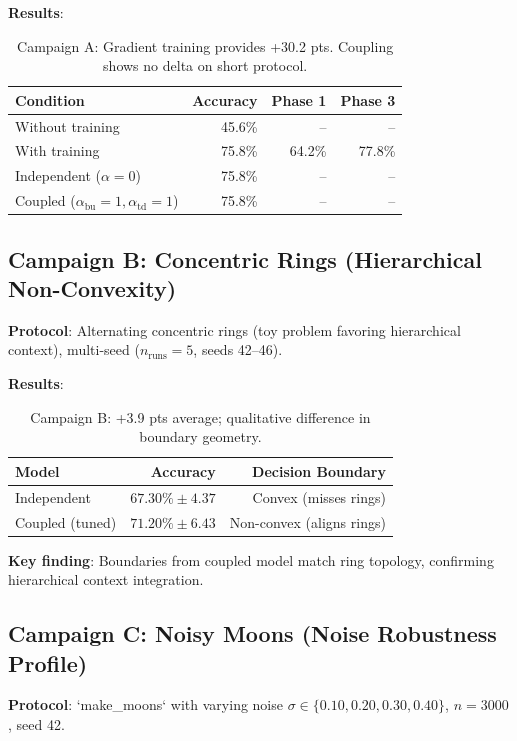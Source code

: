 \documentclass[11pt,a4paper]{article}
\begin{document}
\textbf{Results}:
\begin{table}[h]
\centering
\begin{tabular}{lrrr}
\toprule
\textbf{Condition} & \textbf{Accuracy} & \textbf{Phase 1} & \textbf{Phase 3} \\
\midrule
Without training & 45.6\% & -- & -- \\
With training & 75.8\% & 64.2\% & 77.8\% \\
Independent ($\alpha=0$) & 75.8\% & -- & -- \\
Coupled ($\alpha_{\text{bu}}=1, \alpha_{\text{td}}=1$) & 75.8\% & -- & -- \\
\bottomrule
\end{tabular}
\caption{Campaign A: Gradient training provides +30.2 pts. Coupling shows no delta on short protocol.}
\end{table}

\subsection{Campaign B: Concentric Rings (Hierarchical Non-Convexity)}

\textbf{Protocol}: Alternating concentric rings (toy problem favoring hierarchical context), multi-seed ($n_{\text{runs}}=5$, seeds 42–46).

\textbf{Results}:
\begin{table}[h]
\centering
\begin{tabular}{lrr}
\toprule
\textbf{Model} & \textbf{Accuracy} & \textbf{Decision Boundary} \\
\midrule
Independent & $67.30\% \pm 4.37$ & Convex (misses rings) \\
Coupled (tuned) & $71.20\% \pm 6.43$ & Non-convex (aligns rings) \\
\bottomrule
\end{tabular}
\caption{Campaign B: +3.9 pts average; qualitative difference in boundary geometry.}
\end{table}

\textbf{Key finding}: Boundaries from coupled model match ring topology, confirming hierarchical context integration.

\subsection{Campaign C: Noisy Moons (Noise Robustness Profile)}

\textbf{Protocol}: `make_moons` with varying noise $\sigma \in \{0.10, 0.20, 0.30, 0.40\}$, $n=3000$, seed 42.
\end{document}
